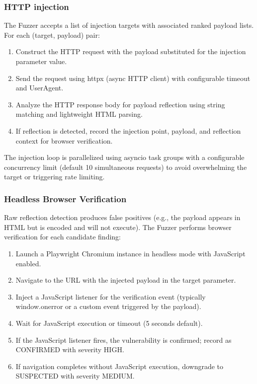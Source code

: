 \subsubsection{HTTP injection}
The Fuzzer accepts a list of injection targets with associated ranked payload lists. For each (target,
payload) pair:
\begin{enumerate}
    \item Construct the HTTP request with the payload substituted for the injection parameter value.
    \item Send the request using httpx (async HTTP client) with configurable timeout and UserAgent.
    \item Analyze the HTTP response body for payload reflection using string matching and lightweight HTML parsing.
    \item If reflection is detected, record the injection point, payload, and reflection context for browser verification.
\end{enumerate}
The injection loop is parallelized using asyncio task groups with a configurable concurrency limit (default 10 simultaneous requests) to avoid overwhelming the target or triggering rate limiting.
\subsubsection{ Headless Browser Verification}
Raw reflection detection produces false positives (e.g., the payload appears in HTML but is encoded and will not execute). The Fuzzer performs browser verification for each candidate finding:
\begin{enumerate}
    \item Launch a Playwright Chromium instance in headless mode with JavaScript enabled.
    \item Navigate to the URL with the injected payload in the target parameter.
    \item  Inject a JavaScript listener for the verification event (typically window.onerror or a custom event triggered by the payload).
    \item Wait for JavaScript execution or timeout (5 seconds default).
    \item If the JavaScript listener fires, the vulnerability is confirmed; record as CONFIRMED with severity HIGH.
    \item If navigation completes without JavaScript execution, downgrade to SUSPECTED with severity MEDIUM.
\end{enumerate}

